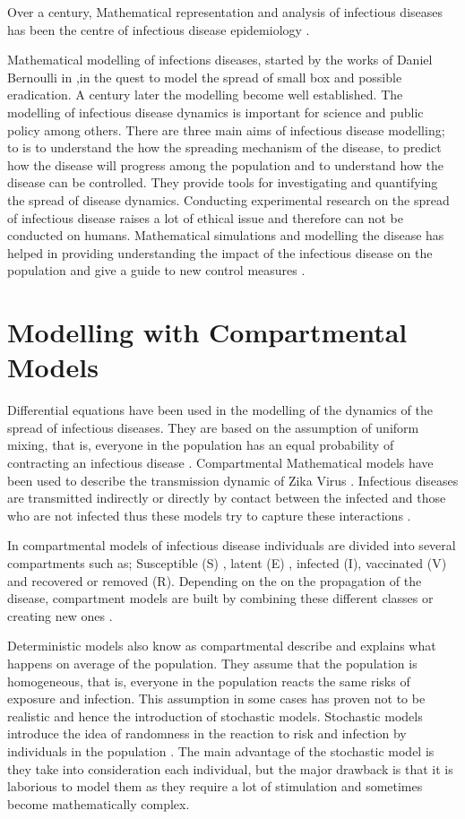 Over a  century, Mathematical representation and analysis of infectious diseases has been the centre of  infectious disease epidemiology \citep{b2005}.

Mathematical modelling of infections diseases, started by the works of Daniel Bernoulli in \cite{bernoulli1760essai},in the quest to model the spread of small box and possible eradication. A century later the modelling become well established. The modelling of infectious disease dynamics is important for science and public policy among others. There are three main aims of infectious disease modelling; to is to understand the how the spreading mechanism of the disease, to  predict how the disease will progress among the population and to understand how the disease can be controlled. They provide tools for investigating and quantifying the spread of disease dynamics. Conducting experimental research on the spread of infectious disease raises a lot of ethical issue and therefore can not be conducted on humans. Mathematical simulations and modelling the disease has helped in providing understanding the impact of the infectious disease on the population and give a guide to new control measures \citep{ming2016stochastic}.


\section{Modelling with Compartmental Models}

Differential equations have been used in the modelling of the dynamics of the spread of infectious diseases. They are based on the assumption of uniform mixing, that is, everyone in the population has an equal probability of contracting an infectious disease \citep{kaplan2002emergency}.
Compartmental Mathematical models have been used to describe the transmission dynamic of Zika Virus \citep{gao2016}. Infectious diseases are transmitted indirectly  or directly by contact between the infected and those who are not infected thus these models try to capture these interactions \citep{sat}. 
 
In compartmental models of infectious disease individuals are divided into  several compartments such as; Susceptible (S) , latent (E) , infected (I), vaccinated (V) and recovered or removed (R). Depending on the on the propagation of the disease, compartment models are built by combining these different classes or creating new ones \citep{li}.

 
Deterministic models also know as compartmental describe and explains what happens on average of the population. They assume that the population is homogeneous, that is, everyone in the population reacts the same risks of exposure and infection. This assumption in some cases has proven not to be realistic and hence the introduction of stochastic models. Stochastic models introduce the idea of randomness in the reaction to risk and infection by individuals in the population \citep{ming2016stochastic}. The main advantage of the stochastic model is they take into consideration each individual, but the major drawback is that it is laborious to model them as they require a lot of stimulation and sometimes become mathematically complex.
 
